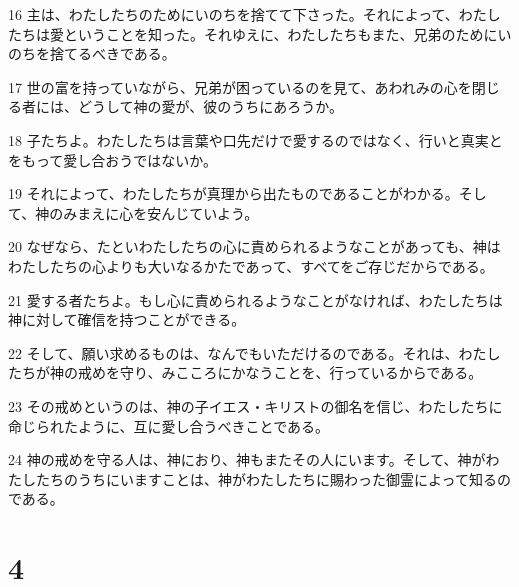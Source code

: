 \par 16 主は、わたしたちのためにいのちを捨てて下さった。それによって、わたしたちは愛ということを知った。それゆえに、わたしたちもまた、兄弟のためにいのちを捨てるべきである。
\par 17 世の富を持っていながら、兄弟が困っているのを見て、あわれみの心を閉じる者には、どうして神の愛が、彼のうちにあろうか。
\par 18 子たちよ。わたしたちは言葉や口先だけで愛するのではなく、行いと真実とをもって愛し合おうではないか。
\par 19 それによって、わたしたちが真理から出たものであることがわかる。そして、神のみまえに心を安んじていよう。
\par 20 なぜなら、たといわたしたちの心に責められるようなことがあっても、神はわたしたちの心よりも大いなるかたであって、すべてをご存じだからである。
\par 21 愛する者たちよ。もし心に責められるようなことがなければ、わたしたちは神に対して確信を持つことができる。
\par 22 そして、願い求めるものは、なんでもいただけるのである。それは、わたしたちが神の戒めを守り、みこころにかなうことを、行っているからである。
\par 23 その戒めというのは、神の子イエス・キリストの御名を信じ、わたしたちに命じられたように、互に愛し合うべきことである。
\par 24 神の戒めを守る人は、神におり、神もまたその人にいます。そして、神がわたしたちのうちにいますことは、神がわたしたちに賜わった御霊によって知るのである。

\chapter{4}

